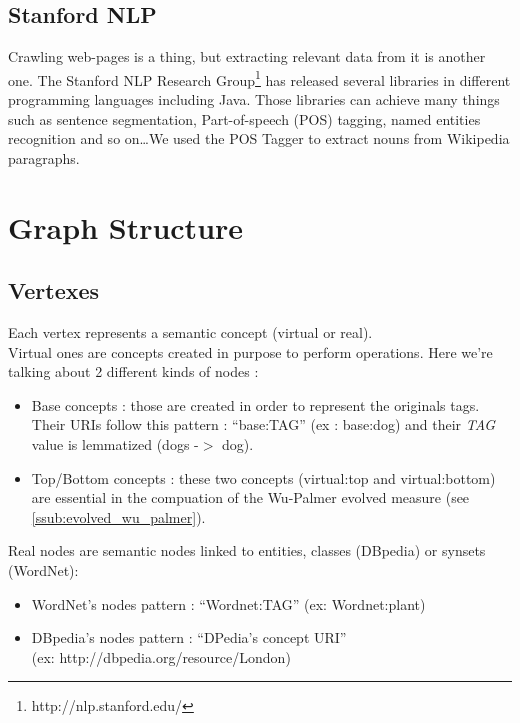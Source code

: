 \subsection{Stanford NLP} %
\label{sub:stanford_nlp}
Crawling web-pages is a thing, but extracting relevant data from it is another one. The Stanford NLP Research Group\footnote{http://nlp.stanford.edu/} has released several libraries in different programming languages including Java. Those libraries can achieve many things such as sentence segmentation, Part-of-speech (POS) tagging, named entities recognition and so on\dots We used the POS Tagger to extract nouns from Wikipedia paragraphs.

\section{Graph Structure} %
\label{sec:graph_structure}

\subsection{Vertexes} %
\label{sub:vertexes}
Each vertex represents a semantic concept (virtual or real).\\
Virtual ones are concepts created in purpose to perform operations. Here we’re talking about 2 different kinds of nodes :
\begin{itemize}
	\item Base concepts : those are created in order to represent the originals tags. Their URIs follow this pattern : “base:TAG” (ex : base:dog) and their \emph{TAG} value is lemmatized (dogs -$>$ dog).
	\item Top/Bottom concepts : these two concepts (virtual:top and virtual:bottom) are essential in the compuation of the Wu-Palmer evolved measure (see \ref{ssub:evolved_wu_palmer}).
\end{itemize}
Real nodes are semantic nodes linked to entities, classes (DBpedia) or synsets (WordNet):
\begin{itemize}
	\item WordNet's nodes pattern : “Wordnet:TAG” (ex: Wordnet:plant)
	\item DBpedia's nodes pattern : “DPedia’s concept URI”\\(ex: http://dbpedia.org/resource/London)
\end{itemize}

